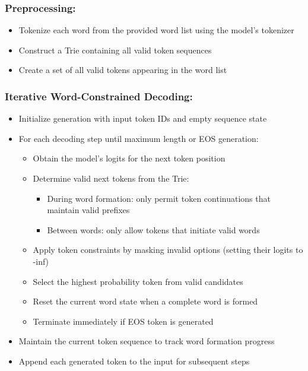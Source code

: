 \documentclass{article}
\begin{document}
\subsubsection{Preprocessing:} 
\begin{itemize}
    \item Tokenize each word from the provided word list using the model's tokenizer
    \item Construct a Trie containing all valid token sequences
    \item Create a set of all valid tokens appearing in the word list
\end{itemize}

\subsubsection{Iterative Word-Constrained Decoding:}
\begin{itemize}
    \item Initialize generation with input token IDs and empty sequence state
    \item For each decoding step until maximum length or EOS generation:
    \begin{itemize}
        \item Obtain the model's logits for the next token position
        \item Determine valid next tokens from the Trie:
        \begin{itemize}
            \item During word formation: only permit token continuations that maintain valid prefixes
            \item Between words: only allow tokens that initiate valid words
        \end{itemize}
        \item Apply token constraints by masking invalid options (setting their logits to -inf)
        \item Select the highest probability token from valid candidates
        \item Reset the current word state when a complete word is formed
        \item Terminate immediately if EOS token is generated
    \end{itemize}
    \item Maintain the current token sequence to track word formation progress
    \item Append each generated token to the input for subsequent steps
\end{itemize}
\end{document}
